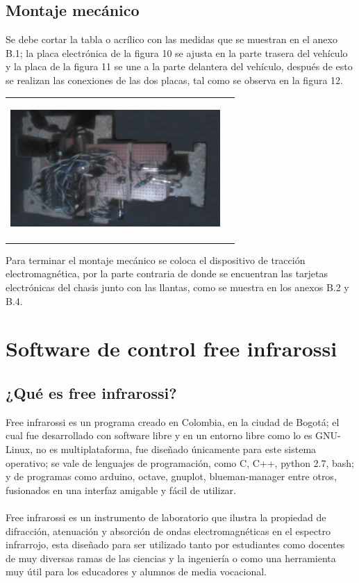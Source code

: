 \documentclass[12]{article}
\newenvironment{Figure}
{\par\medskip\noindent\minipage{\linewidth}}
{\endminipage\par\medskip}
\begin{document}
\begin{multicols}{2}
\subsection{Montaje mecánico}
Se debe cortar la tabla o acrílico con las medidas que se muestran en el anexo B.1; la placa electrónica de la figura 10 se ajusta en la parte trasera del vehículo y la placa de la figura 11 se une a la parte delantera del vehículo, después de esto se realizan las conexiones de las dos placas, tal como se observa en la figura 12.
\begin{Figure}
\center
\begin{tabular}{|l|r|}
\hline
\\
\includegraphics[width=8cm, height=5cm]{img/tar_com.png}  \\\\ \hline
\end{tabular}
\label{fig:g12}
\end{Figure}
Para terminar el montaje mecánico se coloca el dispositivo de tracción electromagnética, por la parte contraria de donde se encuentran las tarjetas electrónicas del chasis junto con las llantas, como se muestra en los anexos B.2 y B.4. 
\section{Software de control free infrarossi}
\subsection{¿Qué es free infrarossi?}
Free infrarossi es un  programa creado en Colombia, en la ciudad de Bogotá; el cual fue desarrollado con software libre y en un entorno libre como lo es GNU-Linux, no es multiplataforma, fue diseñado únicamente para este sistema operativo; se vale de lenguajes de programación, como  C, C++, python 2.7, bash; y de programas como arduino, octave, gnuplot, blueman-manager entre otros, fusionados en una interfaz amigable y fácil de utilizar. \\\\
Free infrarossi es un instrumento de laboratorio que ilustra  la propiedad de difracción, atenuación y absorción de ondas electromagnéticas en el espectro infrarrojo, esta diseñado para ser utilizado tanto por  estudiantes como docentes de muy diversas ramas de las ciencias y  la ingeniería o como una herramienta muy útil para los educadores y alumnos de media vocacional.

\end{multicols}
\end{document}
